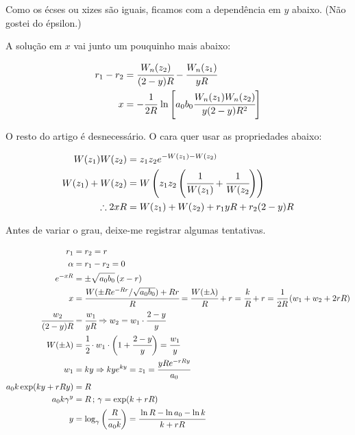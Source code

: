 \documentclass[11pt,a4paper]{article}
\begin{document}
\vspace{3mm}

Como os \'ecses ou xizes s\~ao iguais, ficamos com a depend\^encia em $y$ abaixo. (N\~ao gostei do \'epsilon.)

A solu\c{c}\~ao em $x$ vai junto um pouquinho mais abaixo:

\begin{align}
  r_1 - r_2 &= \cfrac{W_n(z_2)}{(2-y)R} - \cfrac{W_n(z_1)}{yR} \\
  x &= - \cfrac{1}{2R}\, \ln \left[ a_0 b_0 \cfrac{W_n(z_1) W_n(z_2)}{y(2 - y)R^2} \right]
\end{align}

\vspace{3mm}

O resto do artigo \'e desnecess\'ario. O cara quer usar as propriedades abaixo:

\begin{align}
  W(z_1) W(z_2) &= z_1 z_2 e^{-W(z_1) - W(z_2)} \\
  W(z_1) + W(z_2) &= W \left( z_1 z_2 \left( \cfrac{1}{W(z_1)} + \cfrac{1}{W(z_2} \right) \right) \\
  \therefore 2xR &= W(z_1) + W(z_2) + r_1 y R + r_2 (2 - y) R
\end{align}

\vspace{100mm}

Antes de variar o grau, deixe-me registrar algumas tentativas.

\begin{align}
r_1 &= r_2 = r \\
\alpha &= r_1 - r_2 = 0 \\
e^{-xR} &= \pm \sqrt{a_0 b_0} \, (x - r) \\
x &= \cfrac{W(\pm Re^{-Rr}/\sqrt{a_0 b_0}) + Rr}{R} = \cfrac{W(\pm \lambda)}{R} + r = \cfrac{k}{R} + r = \cfrac{1}{2R}\, (w_1 + w_2 + 2rR) \\
\cfrac{w_2}{(2 - y)R} &= \cfrac{w_1}{yR} \Rightarrow w_2 = w_1\cdot \cfrac{2 - y}{y} \\
W(\pm \lambda) &= \cfrac{1}{2} \cdot w_1\cdot \bigg( 1 + \cfrac{2 - y}{y} \bigg) = \cfrac{w_1}{y} \\
w_1 &= ky \Rightarrow kye^{ky} = z_1 = \cfrac{yRe^{-rRy}}{a_0} \\
a_0 k \exp ( ky + rRy ) &= R \\
a_0 k \gamma^y &= R\,;\,\gamma = \exp ( k + rR ) \\
y &= \log_{\gamma} \bigg( \cfrac{R}{a_0 k} \bigg) = \cfrac{\ln R - \ln a_0 - \ln k}{k + rR}
\end{align}
\end{document}
